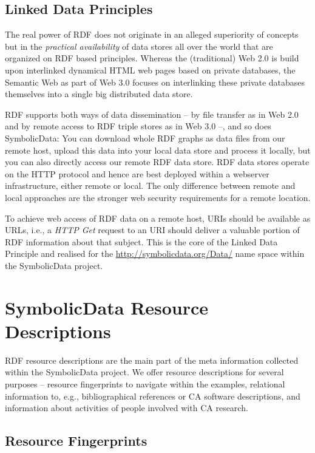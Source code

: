 \documentclass{llncs}
\newcommand{\SD}{{\sc Symbolic\-Data}}
\begin{document}
\subsection{Linked Data Principles}

The real power of RDF does not originate in an alleged superiority of concepts
but in the \emph{practical availability} of data stores all over the world
that are organized on RDF based principles. Whereas the (traditional) Web 2.0
is build upon interlinked dynamical HTML web pages based on private databases,
the Semantic Web as part of Web 3.0 \cite{SemanticWeb} focuses on interlinking
these private databases themselves into a single big distributed data store.

RDF supports both ways of data dissemination -- by file transfer as in Web 2.0
and by remote access to RDF triple stores as in Web 3.0 --, and so does {\SD}:
You can download whole RDF graphs as data files from our remote host, upload
this data into your local data store and process it locally, but you can also
directly access our remote RDF data store. RDF data stores operate on the HTTP
protocol and hence are best deployed within a webserver infrastructure, either
remote or local. The only difference between remote and local approaches are
the stronger web security requirements for a remote location.

To achieve web access of RDF data on a remote host, URIs should be available
as URLs, i.e., a \emph{HTTP Get} request to an URI should deliver a valuable
portion of RDF information about that subject. This is the core of the Linked
Data Principle \cite{lod} and realised for the
\url{http://symbolicdata.org/Data/} name space within the {\SD} project.

\section{{\SD} Resource Descriptions}

RDF resource descriptions are the main part of the meta information collected
within the {\SD} project. We offer resource descriptions for several purposes
-- resource fingerprints to navigate within the examples, relational
information to, e.g., bibliographical references or CA software descriptions,
and information about activities of people involved with CA research. 

\subsection{Resource Fingerprints}
\end{document}
